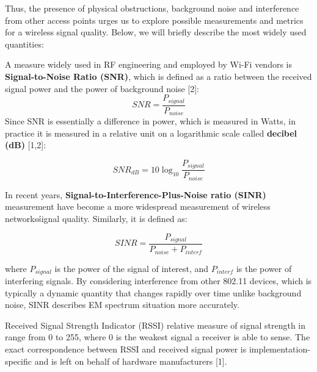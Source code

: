 Thus, the presence of physical obstructions, background noise and interference from other access points urges us to explore possible measurements and metrics for a wireless signal quality. Below, we will briefly describe the most widely used quantities:

A measure widely used in RF engineering and employed by Wi-Fi vendors is \textbf{Signal-to-Noise Ratio (SNR)}, which is defined as a ratio between the received signal power and the power of background noise [2]:
\begin{equation}
    \label{formula:snr}
    SNR = \frac{P_{signal}}{P_{noise}}
\end{equation}
    Since SNR is essentially a difference in power, which is measured in Watts, in practice it is measured in a relative unit on a logarithmic scale called \textbf{decibel (dB)} [1,2]:

\begin{equation}
    \label{formula:snr_db}
    {SNR}_{dB} = 10\log_{10}\frac{P_{signal}}{P_{noise}}
\end{equation}

In recent years, \textbf{Signal-to-Interference-Plus-Noise ratio (SINR)} measurement have become a more widespread measurement of wireless networks\' signal quality. Similarly, it is defined as:

\begin{equation}
    \label{formula:sinr}
    SINR = \frac{P_{signal}}{P_{noise} + P_{interf}}
\end{equation}

    where $P_{signal}$ is the power of the signal of interest, and $P_{interf}$ is the power of interfering signals.
    By considering interference from other 802.11 devices, which is typically a dynamic quantity that changes rapidly over time unlike background noise, SINR describes EM spectrum situation more accurately.

Received Signal Strength Indicator (RSSI) relative measure of signal strength in range from 0 to 255, where 0 is the weakest signal a receiver is able to sense. The exact correspondence between RSSI and received signal power is implementation-specific and is left on behalf of hardware manufacturers [1].

